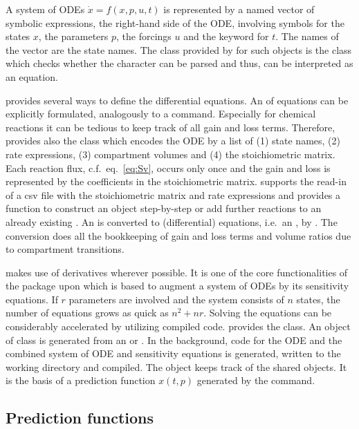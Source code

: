 \documentclass[article]{jss}
\begin{document}
A system of ODEs $\dot x = f(x, p, u, t)$ is represented by a named  vector of symbolic expressions, the right-hand side of the ODE, involving symbols for the states $x$, the parameters $p$, the forcings $u$ and the keyword  for $t$. The names of the vector are the state names. The class provided by  for such objects is the  class which checks whether the character can be parsed and thus, can be interpreted as an equation.

 provides several ways to define the differential equations. An  of equations can be explicitly formulated, analogously to a  command. Especially for chemical reactions it can be tedious to keep track of all gain and loss terms. Therefore,  provides also the  class which encodes the ODE by a list of (1) state names, (2) rate expressions, (3) compartment volumes and (4) the stoichiometric matrix. Each reaction flux, c.f.~eq.~\eqref{eq:Sv}, occurs only once and the gain and loss is represented by the coefficients in the stoichiometric matrix.  supports the read-in of a csv file with the stoichiometric matrix and rate expressions and provides a function  to construct an  object step-by-step or add further reactions to an already existing . An  is converted to (differential) equations, i.e.~an , by . The conversion does all the bookkeeping of gain and loss terms and volume ratios due to compartment transitions.

 makes use of derivatives wherever possible. It is one of the core functionalities of the  package upon which  is based to augment a system of ODEs by its sensitivity equations. If $r$ parameters are involved and the system consists of $n$ states, the number of equations grows as quick as $n^2 + nr$. Solving the equations can be considerably accelerated by utilizing compiled code.  provides the  class. An object of class  is generated from an  or . In the background,  code for the ODE and the combined system of ODE and sensitivity equations is generated, written to the working directory and compiled. The  object keeps track of the shared objects. It is the basis of a prediction function $x(t, p)$ generated by the  command.

\subsection{Prediction functions}
\end{document}

